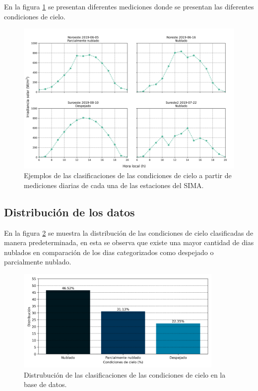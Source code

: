 En la figura \ref{fig:example_sky_conditions} se presentan diferentes mediciones donde se presentan las diferentes condiciones de cielo.
\begin{figure}[H]
	\centering
	\includegraphics[width=12cm]{Graphics/example_sky_conditions.png}
	\caption{Ejemplos de las clasificaciones de las condiciones de cielo a partir de mediciones diarias de cada una de las estaciones del SIMA.}
	\label{fig:example_sky_conditions}
\end{figure}
\subsection{Distribución de los datos}
En la figura \ref{fig:distribution} se muestra la distribución de las condiciones de cielo clasificadas de manera predeterminada, en esta se observa que existe una mayor cantidad de dias nublados en comparación de los dias categorizados como despejado o parcialmente nublado.
\begin{figure}[H]
	\centering
	\includegraphics[width=10cm]{Graphics/distribution_classification.png}
	\caption{Distrubución de las clasificaciones de las condiciones de cielo en la base de datos.}
	\label{fig:distribution}
\end{figure}
